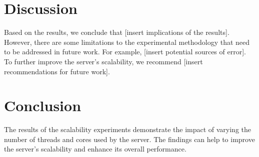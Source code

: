 \documentclass{article}
\begin{document}
\section{Discussion}
Based on the results, we conclude that [insert implications of the results]. However, there are some limitations to the experimental methodology that need to be addressed in future work. For example, [insert potential sources of error]. To further improve the server's scalability, we recommend [insert recommendations for future work].

\section{Conclusion}
The results of the scalability experiments demonstrate the impact of varying the number of threads and cores used by the server. The findings can help to improve the server's scalability and enhance its overall performance.
\end{document}
